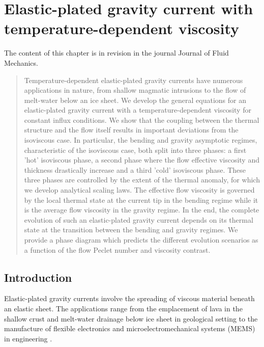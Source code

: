 \chapter{Elastic-plated  gravity  current  with  temperature-dependent
  viscosity}
\label{C3-JFM}

The content of  this chapter is in revision in  the journal Journal of
Fluid Mechanics.

\minitoc

\begin{abstract}
  Temperature-dependent elastic-plated gravity  currents have numerous
  applications in nature, from shallow magmatic intrusions to the flow
  of melt-water below  an ice sheet. We develop  the general equations
  for an  elastic-plated gravity current with  a temperature-dependent
  viscosity for constant influx conditions.  We show that the coupling
  between  the  thermal  structure  and the  flow  itself  results  in
  important deviations  from the  isoviscous case. In  particular, the
  bending  and  gravity  asymptotic  regimes,  characteristic  of  the
  isoviscous  case,  both  split  into three  phases:  a  first  'hot'
  isoviscous phase, a second phase  where the flow effective viscosity
  and  thickness drastically  increase and  a third  'cold' isoviscous
  phase.   These three  phases are  controlled  by the  extent of  the
  thermal anomaly, for  which we develop analytical  scaling laws. The
  effective flow viscosity  is governed by the local  thermal state at
  the current tip  in the bending regime while it  is the average flow
  viscosity in the gravity regime.  In the end, the complete evolution
  of such  an elastic-plated  gravity current  depends on  its thermal
  state at the transition between  the bending and gravity regimes. We
  provide  a  phase diagram  which  predicts  the different  evolution
  scenarios  as a  function of  the flow  Peclet number  and viscosity
  contrast.

\end{abstract}


\section{Introduction}

Elastic-plated  gravity  currents  involve the  spreading  of  viscous
material beneath  an elastic  sheet. The  applications range  from the
emplacement      of      lava      in      the      shallow      crust
\citep{Michaut:2011kg,Bunger:2011cb} and melt-water drainage below ice
sheet  \citep{Das:2008in,Tsai:2010ev}  in  geological setting  to  the
manufacture of flexible electronics and microelectromechanical systems
(MEMS) in engineering \citep{Hosoi:2004dn}.

